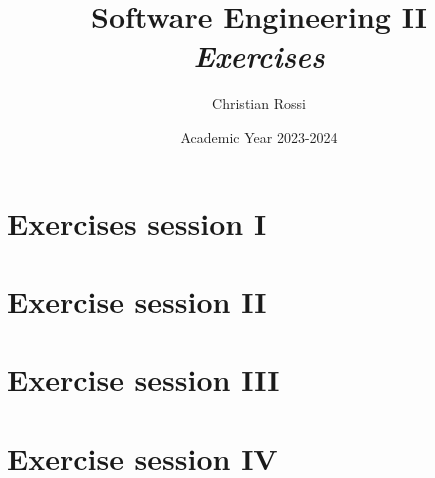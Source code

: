 \documentclass[12pt, a4paper]{report}
\title{Software Engineering II\\ \textit{Exercises}}
\author{Christian Rossi}
\date{Academic Year 2023-2024}
\begin{document}
    \maketitle

    \newpage

    

    \cleardoublepage

    \tableofcontents

    \cleardoublepage

    \chapter{Exercises session I}
    
    

    \chapter{Exercise session II}
    
    

    \chapter*{Exercise session III}
    
    

    \chapter*{Exercise session IV}
    
    
    
\end{document}

